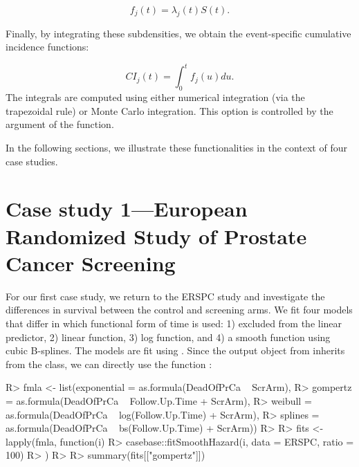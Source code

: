 \documentclass[
]{jss}
\begin{document}
\[ f_j(t) = \lambda_j(t)S(t).\]

Finally, by integrating these subdensities, we obtain the event-specific
cumulative incidence functions:

\[ CI_j(t) = \int_0^t f_j(u)du.\] The integrals are computed using
either numerical integration (via the trapezoidal rule) or Monte Carlo
integration. This option is controlled by the argument  of
the  function.

In the following sections, we illustrate these functionalities in the
context of four case studies.

\hypertarget{case-study-1european-randomized-study-of-prostate-cancer-screening}{%
\section{Case study 1---European Randomized Study of Prostate Cancer
Screening}\label{case-study-1european-randomized-study-of-prostate-cancer-screening}}

For our first case study, we return to the ERSPC study and investigate
the differences in survival between the control and screening arms. We
fit four models that differ in which functional form of time is used: 1)
excluded from the linear predictor, 2) linear function, 3) log function,
and 4) a smooth function using cubic B-splines. The models are fit using
. Since the output object from
 inherits from the  class, we can
directly use the function :

\begin{CodeChunk}

\begin{CodeInput}
R> fmla <- list(exponential = as.formula(DeadOfPrCa ~ ScrArm),
R>              gompertz = as.formula(DeadOfPrCa ~ Follow.Up.Time + ScrArm),
R>              weibull = as.formula(DeadOfPrCa ~ log(Follow.Up.Time) + ScrArm),
R>              splines = as.formula(DeadOfPrCa ~ bs(Follow.Up.Time) + ScrArm))
R> 
R> fits <- lapply(fmla, function(i) {
R>   casebase::fitSmoothHazard(i, data = ERSPC, ratio = 100)
R> })
R> 
R> summary(fits[["gompertz"]])
\end{CodeInput}
\end{CodeChunk}
\end{document}
